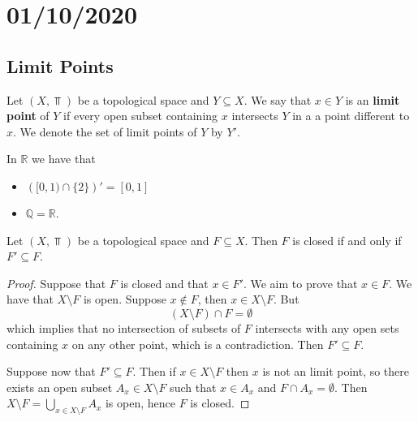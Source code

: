 \documentclass[../../main/main.tex]{subfiles}
\begin{document}
\chapter{01/10/2020}
\label{cpt:lec4}

\section{Limit Points}
\label{sec:label}


\begin{definition}
  Let $(X, \Top)$ be a topological space and $Y \subseteq X$. We say that $x \in Y$ is an {\bf limit point} of $Y$ if every open subset containing $x$ intersects $Y$ in a a point different to $x$. We denote the set of limit points of $Y$ by $Y'$.
\end{definition}

\begin{example}
  In $\mathbb{R}$ we have that
  \begin{itemize}
    \item $\left( [0, 1) \cap \{2\} \right)' = \left[ 0, 1 \right]$
    \item $\mathbb{Q} = \mathbb{R}$.
  \end{itemize}
\end{example}

\begin{theorem}
  \label{thm:limit-points}
  Let $(X, \Top)$ be a topological space and $F \subseteq X$. Then $F$ is closed if and only if $F' \subseteq F$.
\end{theorem}
\begin{proof}
  Suppose that $F$ is closed and that $x \in F'$. We aim to prove that $x \in F$. We have that $X \setminus F$ is open. Suppose $x \notin F$, then $x \in X \setminus F$. But
  \begin{equation*}
    \left( X \setminus F \right)  \cap F = \emptyset
  \end{equation*}
  which implies that no intersection of subsets of $F$ intersects with any open sets containing $x$ on any other point, which is a contradiction. Then $F' \subseteq F$.

  Suppose now that $F' \subseteq F$. Then if $x \in X \setminus F$ then $x$ is not an limit point, so there exists an open subset $A_{x} \in X \setminus F$ such that $x \in A_{x}$ and $F \cap A_{x} = \emptyset$. Then $X \setminus F = \bigcup_{x \in X \setminus F} A_{x}$ is open, hence $F$ is closed.
\end{proof}
\end{document}
